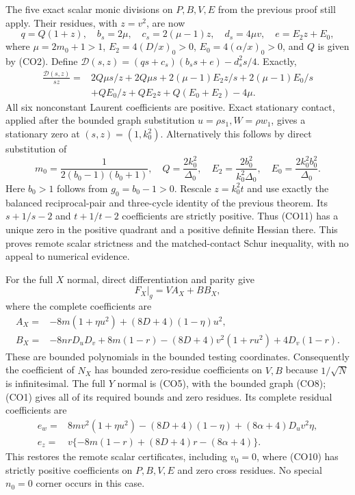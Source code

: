 The five exact scalar monic divisions on $P,B,V,E$ from the previous
proof still apply.  Their residues, with $z=v^2$, are now
\[
 q=Q(1+z),\quad b_s=2\mu,\quad c_s=2(\mu-1)z,
 \quad d_s=4\mu v,\quad e=E_2z+E_0,                    \tag{CO10}
\]
where $\mu=2m_0+1>1$, $E_2=4(D/x)_0>0$,
$E_0=4(\alpha/x)_0>0$, and $Q$ is given by (CO2).
Define
$\mathcal D(s,z)=(qs+c_s)(b_ss+e)-d_s^2s/4$.
Exactly,
\begin{align*}
 \frac{\mathcal D(s,z)}{sz}={}&
 2Q\mu s/z+2Q\mu s
 +2(\mu-1)E_2z/s+2(\mu-1)E_0/s\\
 &+QE_0/z+QE_2z+Q(E_0+E_2)-4\mu.                    \tag{CO11}
\end{align*}
All six nonconstant Laurent coefficients are positive.  Exact
stationary contact, applied after the bounded graph substitution
$u=\rho s_1,W=\rho w_1$, gives a stationary zero at
$(s,z)=(1,k_0^2)$.  Alternatively this follows by direct substitution
of
\[
 m_0=\frac1{2(b_0-1)(b_0+1)},\quad
 Q=\frac{2k_0^2}{\Delta_0},\quad
 E_2=\frac{2b_0^2}{k_0^2\Delta_0},\quad
 E_0=\frac{2k_0^2b_0^2}{\Delta_0}.
\]
Here $b_0>1$ follows from $g_0=b_0-1>0$.
Rescale $z=k_0^2t$ and use exactly the balanced reciprocal-pair and
three-cycle identity of the previous theorem.  Its $s+1/s-2$ and
$t+1/t-2$ coefficients are strictly positive.  Thus (CO11) has a
unique zero in the positive quadrant and a positive definite Hessian
there.  This proves remote scalar strictness and the matched-contact
Schur inequality, with no appeal to numerical evidence.

For the full $X$ normal, direct differentiation and parity give
\[
 \left.F_X\right|_g=V A_X+B B_X,
\]
where the complete coefficients are
\begin{align*}
 A_X={}&-8m(1+\eta u^2)+(8D+4)(1-\eta)u^2,\\
 B_X={}&-8nrD_uD_v+8m(1-r)
       -(8D+4)v^2(1+ru^2)+4D_v(1-r).
\end{align*}
These are bounded polynomials in the bounded testing coordinates.
Consequently the coefficient of $\widehat N_X$ has bounded
zero-residue coefficients on $V,B$ because $1/\sqrt N$ is
infinitesimal.  The full $Y$ normal is (CO5), with the bounded
graph (CO8); (CO1) gives all of its required bounds and zero residues.
Its complete residual coefficients are
\begin{align*}
 e_w={}&8mv^2(1+\eta u^2)-(8D+4)(1-\eta)
                     +(8\alpha+4)D_uv^2\eta,\\
 e_z={}&v\{-8m(1-r)+(8D+4)r-(8\alpha+4)\}.
\end{align*}
This restores the remote scalar certificates, including $v_0=0$,
where (CO10) has strictly positive coefficients on $P,B,V,E$ and
zero cross residues.  No special $n_0=0$ corner occurs in this case.

